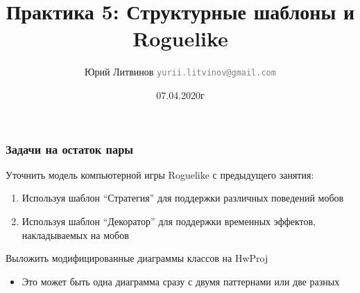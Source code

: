 \documentclass[xetex,mathserif,serif]{beamer}
\title{Практика 5: Структурные шаблоны и Roguelike}
\author[Юрий Литвинов]{Юрий Литвинов \newline \textcolor{gray}{\small\texttt{yurii.litvinov@gmail.com}}}
\date{07.04.2020г}
\begin{document}
	
	\frame{\titlepage}

	\begin{frame}
		\frametitle{Задачи на остаток пары}
		Уточнить модель компьютерной игры Roguelike с предыдущего занятия:

		\begin{enumerate}
			\item Используя шаблон ``Стратегия'' для поддержки различных поведений мобов
			\item Используя шаблон ``Декоратор'' для поддержки временных эффектов, накладываемых на мобов
		\end{enumerate}

		Выложить модифицированные диаграммы классов на HwProj

		\begin{itemize}
			\item Это может быть одна диаграмма сразу с двумя паттернами или две разных
		\end{itemize}
	\end{frame}
\end{document}
